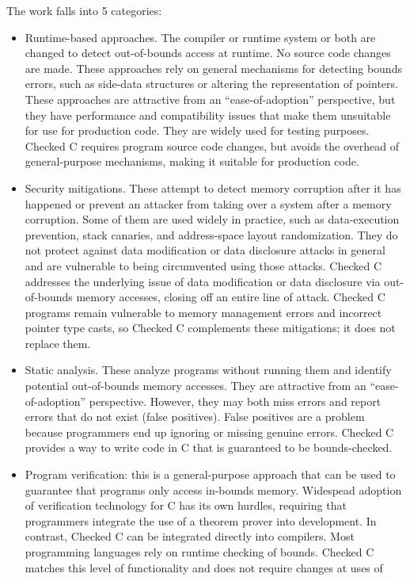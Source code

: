 The work falls into 5 categories:
\begin{itemize}
\item Runtime-based approaches.  The compiler or
runtime system or both are changed to detect out-of-bounds access at runtime.
No source code changes are made.  These approaches rely on general mechanisms for
detecting bounds errors, such as side-data structures or altering
the representation of pointers.  These approaches
are attractive from an ``ease-of-adoption'' perspective, but they have
performance  and compatibility issues that make them unsuitable for use 
for production code.  They are widely used for testing purposes.
Checked C requires program source code changes,
but avoids the overhead of general-purpose mechanisms, making it suitable
for production code.
\item Security mitigations.  These attempt to detect memory
corruption after it has happened or prevent an attacker from taking over a system
after a memory corruption.
Some of them are used widely in practice, such as data-execution prevention,
stack canaries, and address-space layout randomization.  They do not protect
against data modification or data disclosure attacks in general and are 
vulnerable to being circumvented using those attacks.  Checked C addresses
the underlying issue of data modification or data disclosure via
out-of-bounds memory accesses, closing off an entire line of attack.
Checked C programs remain vulnerable to memory management errors and
incorrect pointer type casts, so Checked C complements these mitigations; 
it does not replace them.
\item Static analysis.  These analyze programs without running
them and identify potential out-of-bounds memory accesses.  They are
attractive from an ``ease-of-adoption'' perspective.  However, they
may both miss errors and report errors that do not exist (false positives).
False positives are a problem because programmers end up ignoring or missing
genuine errors.  Checked C provides a way to write code in C that is guaranteed
to be bounds-checked.
\item Program verification: this is a general-purpose approach
that can be used to guarantee that programs only access in-bounds memory. 
Widespead adoption of verification technology for C has its own hurdles,
requiring that programmers integrate the use of a theorem prover into
development. In contrast, Checked C can be integrated directly into compilers.
Most programming languages rely on runtime checking of bounds.  Checked C
matches this level of functionality and does not require changes at uses of

\end{itemize}
